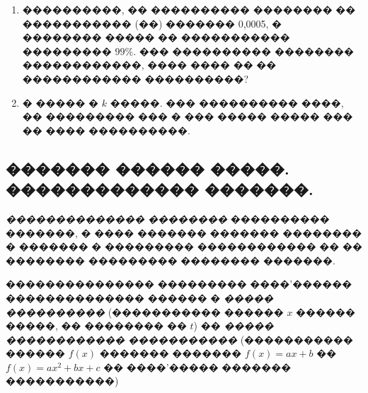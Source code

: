 \documentclass[a4paper,12pt]{article}
\begin{document}
\begin{enumerate}
\item ����������, �� ���������� �������� �� ����������� (��) ������� 0,0005, � �������� ����� ��
����������� ��������� $99\%$. ��� ���������� �������� ������������, ���� ���� �� �� ������������ ����������?

\item � ����� � $k$ �����. ��� ���������� ����, �� ��������� ��� � ��� �����
����� ��� �� ���� ����������.
\end{enumerate}








\newpage

\begin{center}
\section*{������� ������ �����. ������������� �������.}
\end{center}

\textit{�������������� ��������} ���������� �������, � ����
������� ������� �������� � ������� � ��������� ������������ �� ��
�������� ��������� �������� �������.

��������������� ��������� ����'������ �������������� ������ � \textit{����� ����������} (����������� ������ $x$ ������ �����, �� �������� �� $t$) �� \textit{����� ������������ �����������} (����������� ������ $f(x)$ ������� ������� $f(x)=ax+b$ �� $f(x)=ax^{2}+bx+c$ �� ����'����� ������� �����������)


\medskip\medskip\medskip
\end{document}
